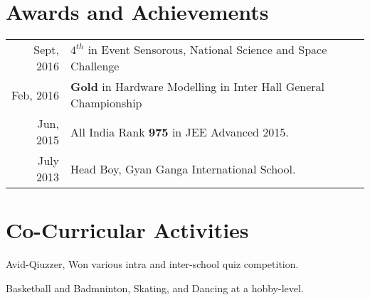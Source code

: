 \documentclass[letterpaper]{deedy-resume} %
\begin{document}
\begin{minipage}[t]{0.66\textwidth}

\section{Awards and Achievements} 

\begin{tabular}{rl}
Sept, 2016 & $4^{th}$ in Event Sensorous, National Science and Space Challenge\\
Feb, 2016 & \textbf{Gold} in Hardware Modelling in Inter Hall General Championship\\
Jun, 2015 & All India Rank \textbf{975} in JEE Advanced 2015.\\
July 2013 & Head Boy, Gyan Ganga International School.\\
\end{tabular}

\sectionspace %


\section{Co-Curricular Activities} 
\sectionspace
\sectionspace
\begin{tightitemize} 
\item Avid-Qiuzzer, Won various intra and inter-school quiz competition.
\item Basketball and Badmninton, Skating, and Dancing at a hobby-level.
\end{tightitemize}



\end{minipage}
\end{document}

